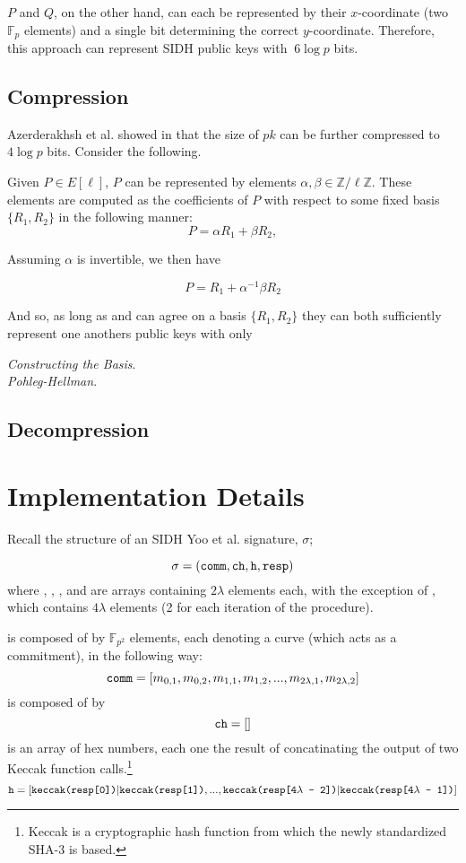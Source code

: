 $P$ and $Q$, on the other hand, can each be represented by their $x$-coordinate (two $\mathbb{F}_{p}$ elements) and a single bit determining the correct $y$-coordinate. Therefore, this approach can represent SIDH public keys with $~6\log p$ bits.

\subsection{Compression}

Azerderakhsh et al. showed in \cite{compwr} that the size of $pk$ can be further compressed to $4\log p$ bits. Consider the following.

Given $P \in E[\ell]$, $P$ can be represented by elements $\alpha, \beta \in \mathbb{Z}/\ell\mathbb{Z}$. These elements are computed as the coefficients of $P$ with respect to some fixed basis $\{R_1, R_2\}$ in the following manner: 
$$
P = \alpha R_1 + \beta R_2,
$$

Assuming $\alpha$ is invertible, we then have

$$
P = R_1 + \alpha^{-1}\beta R_2
$$

And so, as long as \alice and \bob can agree on a basis $\{R_1, R_2\}$ they can both sufficiently represent one anothers public keys with only 

\noindent
\textit{Constructing the Basis}.\\

\noindent
\textit{Pohleg-Hellman}.

\subsection{Decompression}

\section{Implementation Details}
\label{sec:compimplementation}

Recall the structure of an SIDH Yoo et al. signature, $\sigma$;

$$
\sigma = (\texttt{comm}, \texttt{ch}, \texttt{h}, \texttt{resp})
$$
where , , , and  are arrays containing $2\lambda$ elements each, with the exception of , which contains $4\lambda$ elements (2 for each iteration of the procedure).

 is composed of by $\mathbb{F}_{p^2}$ elements, each denoting a curve (which acts as a commitment), in the following way:
$$
\texttt{comm} = [m_{0, 1}, m_{0, 2}, m_{1, 1}, m_{1, 2}, ... , m_{2\lambda, 1}, m_{2\lambda, 2}]
$$
 is composed of by
$$
\texttt{ch} = []
$$
 is an array of hex numbers, each one the result of concatinating the output of two Keccak function calls.\footnote{Keccak is a cryptographic hash function from which the newly standardized SHA-3 is based.} 
$$
\texttt{h} = [\texttt{keccak(resp[0])}|\texttt{keccak(resp[1])}, ... , \texttt{keccak(resp[4}\lambda\texttt{ - 2])}|\texttt{keccak(resp[4}\lambda\texttt{ - 1])}]
$$

